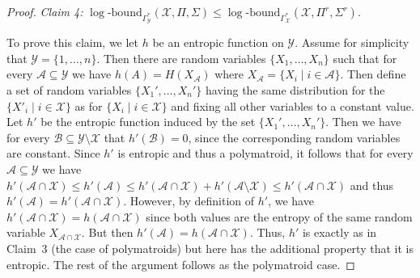 \documentclass[10pt,a4paper]{amsart}
\newcommand{\logb}{\mathrm{\log\text{-}bound}}
\newcommand{\vset}[1]{\mathcal{#1}}
\begin{document}
\begin{proof}
\smallskip
	 
\emph{Claim 4:}	
	 $\logb_{\Gamma^*_{\vset Y}}(\vset X, \Pi, \Sigma) \le \logb_{\Gamma^*_{\vset X}}(\vset X, \Pi^r, \Sigma^r)$.
	 
	 To prove this claim, we  let $h$ be an entropic function on $\vset Y$. Assume for simplicity that $\vset Y = \{1, \ldots, n\}$. Then there are random variables $\{X_1 , \ldots, X_n\}$ such that for every $\mathcal A\subseteq \vset Y$ we have $h(A) = H(X_{\vset A})$ where $X_{\vset A} = \{X_i\mid i\in \vset A\}$. Then define a set of random variables $\{X_1', \ldots, X_n'\}$ having the same distribution for the $\{X'_i\mid i\in \vset X\}$ as for $\{X_i\mid i\in \vset X\}$ and fixing all other variables to a constant value. Let $h'$ be the entropic function induced by the set $\{X_1', \ldots, X_n' \}$. Then we have for every $\vset B \subseteq \vset Y \setminus\vset X$ that $h'(\vset B) = 0$, since the corresponding random variables are constant. Since $h'$ is entropic and thus a polymatroid, it follows that for every $\vset A \subseteq \vset Y$ we have $h'(\vset A \cap \vset X) \le h'(\vset A) \le  h'(\vset A \cap \vset X) + h'(\vset A \setminus \vset X) \le h'(\vset A \cap \vset X)$ and thus $h'(\vset A) = h'(\vset A \cap \vset X)$. However, by definition of $h'$, we have $h'(\vset A\cap \vset X) = h(\vset A\cap \vset X)$ since both values are the entropy of the same random variable $X_{\vset A\cap \vset X}$. But then $h'(\vset A) = h(\vset A\cap \vset X)$. Thus, $h'$ is exactly as in 
	 Claim~3 (the case of polymatroids) but here has the additional property that it is entropic. The rest of the argument follows as the polymatroid case.
\end{proof}
\end{document}
